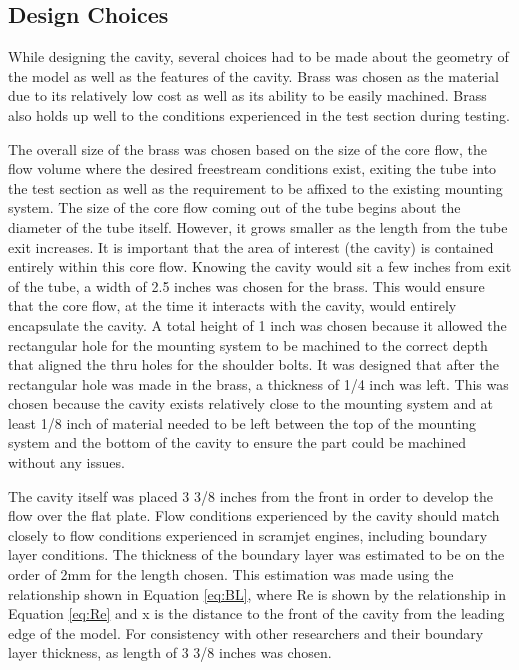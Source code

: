 \subsection{Design Choices}

While designing the cavity, several choices had to be made about the geometry of the model as well as the features of the cavity. Brass was chosen as the material due to its relatively low cost as well as its ability to be easily machined. Brass also holds up well to the conditions experienced in the test section during testing. 

The overall size of the brass was chosen based on the size of the core flow, the flow volume where the desired freestream conditions exist, exiting the tube into the test section as well as the requirement to be affixed to the existing mounting system. The size of the core flow coming out of the tube begins about the diameter of the tube itself. However, it grows smaller as the length from the tube exit increases. It is important that the area of interest (the cavity) is contained entirely within this core flow. Knowing the cavity would sit a few inches from exit of the tube, a width of 2.5 inches was chosen for the brass. This would ensure that the core flow, at the time it interacts with the cavity, would entirely encapsulate the cavity. A total height of 1 inch was chosen because it allowed the rectangular hole for the mounting system to be machined to the correct depth that aligned the thru holes for the shoulder bolts. It was designed that after the rectangular hole was made in the brass, a thickness of 1/4 inch was left. This was chosen because the cavity exists relatively close to the mounting system and at least 1/8 inch of material needed to be left between the top of the mounting system and the bottom of the cavity to ensure the part could be machined without any issues. 

The cavity itself was placed 3 3/8 inches from the front in order to develop the flow over the flat plate. Flow conditions experienced by the cavity should match closely to flow conditions experienced in scramjet engines, including boundary layer conditions. The thickness of the boundary layer was estimated to be on the order of 2mm for the length chosen. This estimation was made using the relationship shown in Equation \ref{eq:BL}, where Re is shown by the relationship in Equation \ref{eq:Re} and x is the distance to the front of the cavity from the leading edge of the model. For consistency with other researchers and their boundary layer thickness, as length of 3 3/8 inches was chosen.

